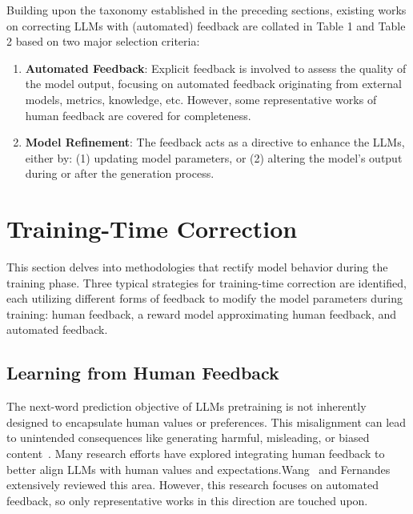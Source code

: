 \documentclass[a4paper,oneside]{book}
\begin{document}
Building upon the taxonomy established in the preceding sections, existing works on correcting LLMs with (automated) feedback are collated in Table 1 and Table 2 based on two major selection criteria:

\begin{enumerate}
    \item \textbf{Automated Feedback}: Explicit feedback is involved to assess the quality of the model output, focusing on automated feedback originating from external models, metrics, knowledge, etc. However, some representative works of human feedback are covered for completeness.

    \item \textbf{Model Refinement}: The feedback acts as a directive to enhance the LLMs, either by: (1) updating model parameters, or (2) altering the model's output during or after the generation process.
\end{enumerate}

\section{Training-Time Correction}
This section delves into methodologies that rectify model behavior during the training phase. Three typical strategies for training-time correction are identified, each utilizing different forms of feedback to modify the model parameters during training: human feedback, a reward model approximating human feedback, and automated feedback.

\subsection{Learning from Human Feedback}
The next-word prediction objective of LLMs pretraining is not inherently designed to encapsulate human values or preferences. This misalignment can lead to unintended consequences like generating harmful, misleading, or biased content~\cite{kenton2021alignment}. Many research efforts have explored integrating human feedback to better align LLMs with human values and expectations.Wang~\cite{wang2023aligning} and Fernandes~\cite{fernandes2023bridging} extensively reviewed this area. However, this research focuses on automated feedback, so only representative works in this direction are touched upon.
\end{document}
